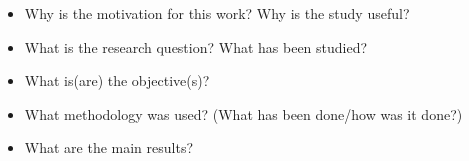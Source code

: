 \lipsum[1-2]
\begin{itemize}
\item Why is the motivation for this work? Why is the study useful?
\item What is the research question? What has been studied?
\item What is(are) the objective(s)?
\item What methodology was used? (What has been done/how was it done?)
\item What are the main results?
\end{itemize}

